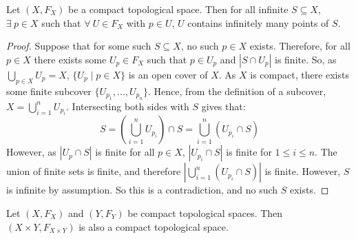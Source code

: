 \begin{theorem}
	 Let $(X,F_X)$ be a compact topological space. Then for all infinite $S \subseteq X$, $\exists \ p \in X$ such that $\forall \ U \in F_X$ with $p \in U$, $U$ contains infinitely many points of $S$. 
\end{theorem}
\begin{proof}
	Suppose that for some such $S \subseteq X$, no such $p \in X$ exists. Therefore, for all $p \in X$ there exists some $U_p \in F_X$ such that $p \in U_p$ and $|S \cap U_p|$ is finite. So, as $\displaystyle{\bigcup_{p \in X} U_p = X}$, $\{U_p \mid p \in X\}$ is an open cover of $X$. As $X$ is compact, there exists some finite subcover $\{U_{p_1},...,U_{p_n}\}$. Hence, from the definition of a subcover, $\displaystyle{X = \bigcup_{i=1}^n U_{p_i}}$. Intersecting both sides with $S$ gives that:
	\[S = \left(\bigcup_{i=1}^n U_{p_i}\right) \cap S = \bigcup_{i=1}^n (U_{p_i} \cap S)\]
	However, as $|U_p \cap S|$ is finite for all $p \in X$, $|U_{p_i} \cap S|$ is finite for $1 \leq i \leq n$. The union of finite sets is finite, and therefore $\left|\bigcup_{i=1}^n (U_{p_i} \cap S)\right|$ is finite. However, $S$ is infinite by assumption. So this is a contradiction, and no such $S$ exists. 
\end{proof}
\begin{theorem}
	 Let $(X,F_X)$ and $(Y,F_Y)$ be compact topological spaces. Then $(X \times Y, F_{X \times Y})$ is also a compact topological space. 
\end{theorem}
